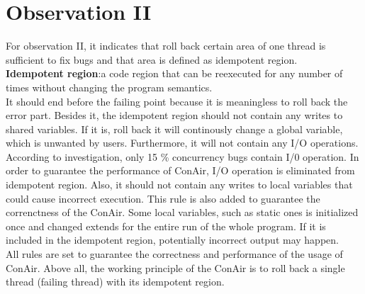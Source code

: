\section{Observation II}
\label{sbii}
For observation II, it indicates that roll back certain area of one thread is sufficient to fix bugs and that area is defined as idempotent region.\\
\textbf{Idempotent region}:a code region that can be reexecuted for any number of times without changing the program semantics.\\
It should end before the failing point because it is meaningless to roll back the error part. Besides it, the idempotent region should not contain any writes to shared variables. If it is, roll back it will continously change a global variable, which is unwanted by users. Furthermore, it will not contain any I/O operations. According to investigation, only 15 \% concurrency bugs contain I/0 operation. In order to guarantee the performance of ConAir, I/O operation is eliminated from idempotent region. Also, it should not contain any writes to local variables that could cause incorrect execution. This rule is also added to guarantee the correnctness of the ConAir. Some local variables, such as static ones is initialized once and changed extends for the entire run of the whole program. If it is included in the idempotent region, potentially incorrect output may happen.\\
All rules are set to guarantee the correctness and performance of the usage of ConAir. Above all, the working principle of the ConAir is to roll back a single thread (failing thread) with its idempotent region.

 